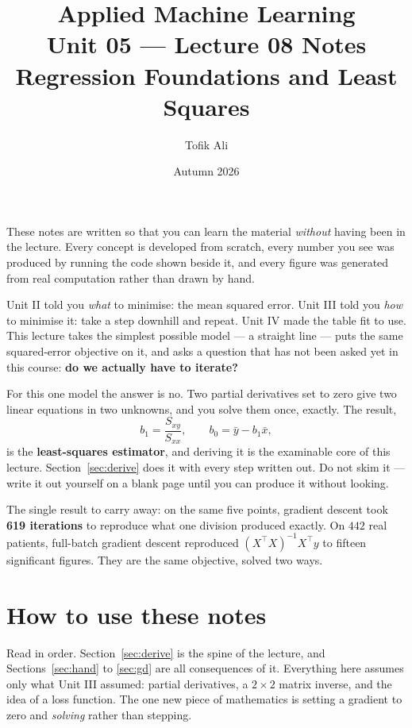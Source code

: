 \documentclass[11pt]{article}
\title{Applied Machine Learning\\Unit 05 --- Lecture 08 Notes\\
       Regression Foundations and Least Squares}
\author{Tofik Ali}
\date{Autumn 2026}
\begin{document}
\maketitle

\begin{keyidea}
These notes are written so that you can learn the material \emph{without}
having been in the lecture. Every concept is developed from scratch, every
number you see was produced by running the code shown beside it, and every
figure was generated from real computation rather than drawn by hand.

Unit II told you \emph{what} to minimise: the mean squared error. Unit III
told you \emph{how} to minimise it: take a step downhill and repeat. Unit IV
made the table fit to use. This lecture takes the simplest possible model ---
a straight line --- puts the same squared-error objective on it, and asks a
question that has not been asked yet in this course: \textbf{do we actually
have to iterate?}

For this one model the answer is no. Two partial derivatives set to zero give
two linear equations in two unknowns, and you solve them once, exactly. The
result,
\[
  b_1 = \frac{S_{xy}}{S_{xx}}, \qquad b_0 = \bar y - b_1\bar x,
\]
is the \textbf{least-squares estimator}, and deriving it is the examinable
core of this lecture. Section~\ref{sec:derive} does it with every step
written out. Do not skim it --- write it out yourself on a blank page until
you can produce it without looking.

The single result to carry away: on the same five points, gradient descent
took \textbf{619 iterations} to reproduce what one division produced exactly.
On $442$ real patients, full-batch gradient descent reproduced
$(X^{\!\top}\!X)^{-1}X^{\!\top}y$ to fifteen significant figures. They are
the same objective, solved two ways.
\end{keyidea}

\tableofcontents
\medskip

\section{How to use these notes}
\label{sec:how}

Read in order. Section~\ref{sec:derive} is the spine of the lecture, and
Sections~\ref{sec:hand} to \ref{sec:gd} are all consequences of it.
Everything here assumes only what Unit III assumed: partial derivatives, a
$2\times2$ matrix inverse, and the idea of a loss function. The one new piece
of mathematics is setting a gradient to zero and \emph{solving} rather than
stepping.
\end{document}

